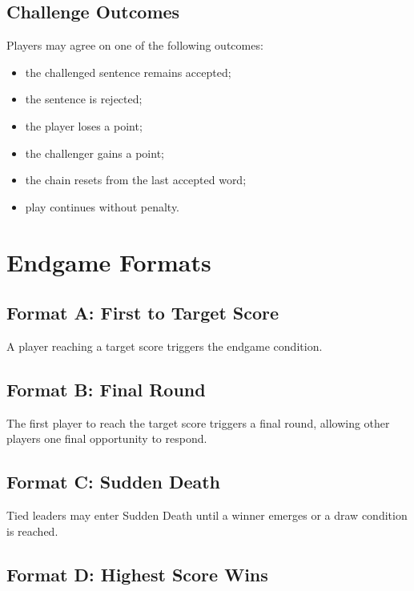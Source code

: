 \documentclass[11pt,a4paper]{article}
\begin{document}
\subsection{Challenge Outcomes}

Players may agree on one of the following outcomes:

\begin{itemize}
    \item the challenged sentence remains accepted;
    \item the sentence is rejected;
    \item the player loses a point;
    \item the challenger gains a point;
    \item the chain resets from the last accepted word;
    \item play continues without penalty.
\end{itemize}

\section{Endgame Formats}

\subsection{Format A: First to Target Score}

A player reaching a target score triggers the endgame condition.

\subsection{Format B: Final Round}

The first player to reach the target score triggers a final round, allowing other players one final opportunity to respond.

\subsection{Format C: Sudden Death}

Tied leaders may enter Sudden Death until a winner emerges or a draw condition is reached.

\subsection{Format D: Highest Score Wins}
\end{document}
